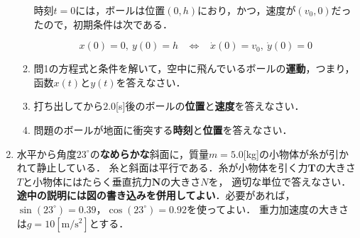 \documentclass[a4paper,11pt]{ltjsarticle}
\begin{document}
\begin{enumerate}
\begin{enumerate}[label=(\arabic*)]
        時刻$t=0$には，ボールは位置$(0,h)$におり，かつ，速度が$(v_0,0)$だったので，初期条件は次である．

        \begin{equation*}
            x(0)=0,\ y(0)=h  \hspace{10pt} \Leftrightarrow \hspace{10pt}
            \dot{x}(0)=v_0,\ \dot{y}(0)=0
        \end{equation*}

        \vspace{5pt}

        \item 問1の方程式と条件を解いて，空中に飛んでいるボールの\textbf{運動}，つまり，函数$x(t)$と$y(t)$を答えなさい．
        
        \vspace{50pt}

        \item 打ち出してから$2.0$[s]後のボールの\textbf{位置}と\textbf{速度}を答えなさい．

        \vspace{50pt}

        \item 問題のボールが地面に衝突する\textbf{時刻}と\textbf{位置}を答えなさい．
    \end{enumerate}

\clearpage

    \item 水平から角度$23^\circ$の\textbf{なめらかな}斜面に，質量$m=5.0$[kg]の小物体が糸が引かれて静止している．
    糸と斜面は平行である．糸が小物体を引く力$\bm{T}$の大きさ$T$と小物体にはたらく垂直抗力$\bm{N}$の大きさ$N$を，
    適切な単位で答えなさい．\textbf{途中の説明には図の書き込みを併用してよい}．必要があれば，$\sin(23^\circ)=0.39$，$\cos(23^\circ)=0.92$を使ってよい．
    重力加速度の大きさは$g=10[\mathrm{m/s^2}]$とする．

    \begin{center}
        \end{center}


\end{enumerate}
\end{document}
